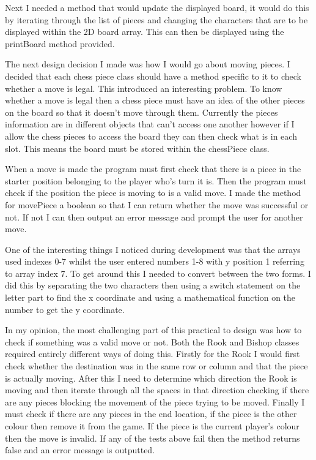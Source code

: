 \documentclass[a4paper]{article}
\begin{document}
Next I needed a method that would update the displayed board, it would do this by iterating through the list of pieces and changing the characters that are to be displayed within the 2D board array. This can then be displayed using the printBoard method provided.

The next design decision I made was how I would go about moving pieces. I decided that each chess piece class should have a method specific to it to check whether a move is legal. This introduced an interesting problem. To know whether a move is legal then a chess piece must have an idea of the other pieces on the board so that it doesn't move through them. Currently the pieces information are in different objects that can't access one another however if I allow the chess pieces to access the board they can then check what is in each slot. This means the board must be stored within the chessPiece class.

When a move is made the program must first check that there is a piece in the starter position belonging to the player who's turn it is. Then the program must check if the position the piece is moving to is a valid move. I made the method for movePiece a boolean so that I can return whether the move was successful or not. If not I can then output an error message and prompt the user for another move.

One of the interesting things I noticed during development was that the arrays used indexes 0-7 whilst the user entered numbers 1-8 with y position 1 referring to array index 7. To get around this I needed to convert between the two forms. I did this by separating the two characters then using a switch statement on the letter part to find the x coordinate and using a mathematical function on the number to get the y coordinate.

In my opinion, the most challenging part of this practical to design was how to check if something was a valid move or not. Both the Rook and Bishop classes required entirely different ways of doing this. Firstly for the Rook I would first check whether the destination was in the same row or column and that the piece is actually moving. After this I need to determine which direction the Rook is moving and then iterate through all the spaces in that direction checking if there are any pieces blocking the movement of the piece trying to be moved. Finally I must check if there are any pieces in the end location, if the piece is the other colour then remove it from the game. If the piece is the current player's colour then the move is invalid. If any of the tests above fail then the method returns false and an error message is outputted.
\end{document}
